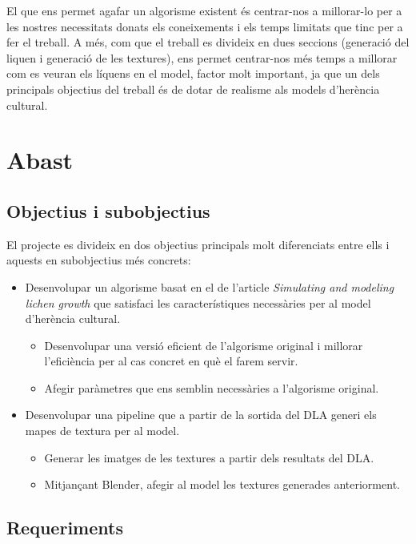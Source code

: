 \documentclass{article}
\begin{document}
El que ens permet agafar un algorisme existent és centrar-nos a millorar-lo per a les nostres necessitats donats els coneixements i els temps limitats que tinc per a fer el treball. A més, com que el treball es divideix en dues seccions (generació del liquen i generació de les textures), ens permet centrar-nos més temps a millorar com es veuran els líquens en el model, factor molt important, ja que un dels principals objectius del treball és de dotar de realisme als models d'herència cultural.

\newpage

\section{Abast}

\subsection{Objectius i subobjectius}

El projecte es divideix en dos objectius principals molt diferenciats entre ells i aquests en subobjectius més concrets:

\begin{itemize}
    \item Desenvolupar un algorisme basat en el de l'article \textit{Simulating and modeling lichen growth}  \cite{Simulating-and-modeling-lichen-growth} que satisfaci les característiques necessàries per al model d'herència cultural.
    \begin{itemize}
        \item Desenvolupar una versió eficient de l'algorisme original i millorar l'eficiència per al cas concret en què el farem servir.
        \item Afegir paràmetres que ens semblin necessàries a l'algorisme original.
    \end{itemize}
    \item Desenvolupar una pipeline que a partir de la sortida del DLA generi els mapes de textura per al model.
    \begin{itemize}
        \item Generar les imatges de les textures a partir dels resultats del DLA.
        \item Mitjançant Blender, afegir al model les textures generades anteriorment.
    \end{itemize}
\end{itemize}

\subsection{Requeriments}
\end{document}
